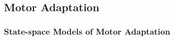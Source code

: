 \documentclass[../main.tex]{subfiles}
\begin{document}


\subsection{Motor Adaptation}\label{motor-adaptation}




\subsubsection{State-space Models of Motor Adaptation}\label{state-space-models-of-motor-adaptation}



\end{document}
